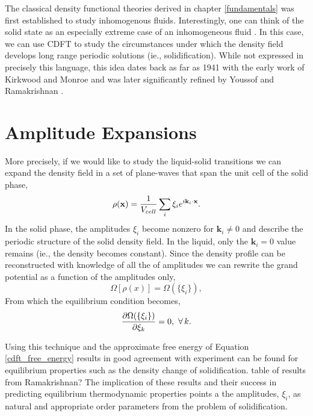 \label{dft_of_freezing}

The classical density functional theories derived in chapter
\ref{fundamentals} was first established to study inhomogenous fluids.
Interestingly, one can think of the solid state as an especially extreme
case of an inhomogeneous fluid \cite{HANSEN-CH6}.  In this case, we can
use CDFT to study the circumstances under which the density field develops
long range periodic solutions (ie., solidification).  While not expressed
in precisely this language, this idea dates back as far as 1941 with the
early work of Kirkwood and Monroe \cite{KIRKWOOD_MONROE41} and was later
significantly refined by Youssof and Ramakrishnan \cite{RAMAKRISHNAN79}.

\section{Amplitude Expansions} %

More precisely, if we would like to study the liquid-solid transitions we
can expand the density field in a set of plane-waves that span the unit
cell of the solid phase,
%
\begin{equation} \rho(\mathbf{x}) = \frac{1}{V_{cell}} \sum_i \xi_i e^{i
\mathbf{k}_i \cdot \mathbf{x}}.  \end{equation}
%
In the solid phase, the amplitudes $\xi_i$ become nonzero for
$\mathbf{k}_i \ne 0$ and describe the periodic structure of the solid
density field.  In the liquid, only the $\mathbf{k}_i = 0$ value remains
(ie., the density becomes constant).  Since the density profile can be
reconstructed with knowledge of all the of amplitudes we can rewrite the
grand potential as a function of the amplitudes only, 
%
\begin{equation} \Omega[\rho(x)] = \Omega(\lbrace\xi_i\rbrace),
\end{equation}
%
From which the equilibrium condition becomes,
%
\begin{equation} \frac{\partial \Omega(\lbrace\xi_i\rbrace)}{\partial \xi_k}
= 0, \,\,\forall \,k.  \end{equation}
%

Using this technique and the approximate free energy of Equation
\ref{cdft_free_energy} results in good agreement with experiment can be found
for equilibrium properties such as the density change of solidification.
{\color{ForestGreen} table of results from Ramakrishnan? } The implication of
these results and their success in predicting equilibrium thermodynamic
properties points a the amplitudes, $\xi_i$, as natural and appropriate order
parameters from the problem of solidification. 


